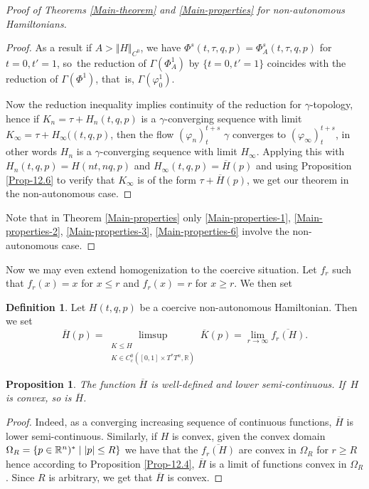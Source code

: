 \documentclass[JEP,XML,SOM,NoFloatCountersInSection,Unicode,published]{cedram}
\numberwithin{equation}{section}
\theoremstyle{plain}
\newtheorem{proposition}[theorem]{Proposition}
\theoremstyle{definition}
\newtheorem{definition}[theorem]{Definition}
\theoremstyle{remark}
\begin{document}
\begin{proof} [Proof of Theorems \ref{Main-theorem} and \ref{Main-properties} for non-autonomous Hamiltonians]
\begin{proof}
As a result if $ A > \Vert H \Vert _{C^0}$, we have $\Phi^s(t,\tau,q,p)=\Phi_A^s(t,\tau,q,p)$ for $t=0, t'=1$, so~the reduction of $\Gamma(\Phi_A^1)$ by $\{t=0,t'=1\}$ coincides with the reduction of $\Gamma (\Phi^1)$, that~is, $\Gamma(\varphi_0^1)$.

Now the reduction inequality \cite[Prop.\,5.1, p.\,705]{Viterbo-STAGGF} implies continuity of the reduction for $\gamma$-topology, hence if
$K_n= \tau+H_n(t,q,p)$ is a $\gamma$-converging sequence with limit $K_\infty=\tau+H_\infty((t,q,p)$, then the flow $(\varphi_n)_t^{t+s}$ $\gamma$ converges to $(\varphi_\infty)_t^{t+s}$, in other words $H_n$ is a $\gamma$-converging sequence with limit $H_\infty$. Applying this with $H_n(t,q,p)=H(nt,nq,p)$ and $H_\infty(t,q,p)=\overline H(p)$ and using Proposition \ref{Prop-12.6} to verify that $K_\infty$ is of the form $\tau+\overline H(p)$, we get our theorem in the non-autonomous case.
\end{proof}
Note that in Theorem \ref{Main-properties} only \eqref{Main-properties-1}, \eqref{Main-properties-2}, \eqref{Main-properties-3}, \eqref{Main-properties-6} involve the non-autonomous case.
\end{proof}
Now we may even extend homogenization to the coercive situation. Let $f_{r}$ such that $f_{r}(x)=x$ for $ x \leq r$ and $f_{r}(x)=r$ for $x\geq r$.
We then set

\begin{definition}
Let $H(t,q,p)$ be a coercive non-autonomous Hamiltonian. Then we set\vspace*{-3pt}
\[
\overline H(p)= \limsup_{\substack{K\leq H\\ K \in C_{c}^0([0,1]\times T^*T^n, {\mathbb R})}} \overline K(p)=\lim_{r \to \infty} \overline {f_{r}(H)}.
\]
\end{definition}

\begin{proposition} \label{nonaut-coercive-homogenization}
The function $\overline H$ is well-defined and lower semi-continuous. If~$H$ is convex, so is $\overline H$.
\end{proposition}
\begin{proof}
Indeed, as a converging increasing sequence of continuous functions, $\overline H$ is lower semi-continuous. Similarly, if $H$ is convex, given the convex domain $\Omega_R=\{ p \in\nobreak {\mathbb R}^n)^* \mid \vert p \vert \leq R\} $ we have that the $\overline{f_r(H)}$ are convex in $\Omega_R$ for $r\geq R$ hence according to Proposition \ref{Prop-12.4}, $\overline H$ is a limit of functions convex in $\Omega_R$. Since $R$ is arbitrary, we get that $\overline H$ is convex.
\end{proof}
\end{document}
